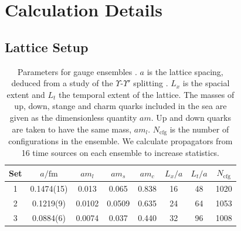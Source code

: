 
\section{Calculation Details}
\label{sec:deets}

\subsection{Lattice Setup}


\begin{table}
\begin{center}
 \begin{tabular}{||c c c c c c c c||}
 \hline
 Set & $a/\text{fm}$ & $am_l$ & $am_s$ & $am_c$ & $L_x/a$ & $L_t/a$ & $N_{\text{cfg}}$ \\ [0.5ex] 
 \hline\hline
 1 & 0.1474(15) & 0.013 & 0.065 & 0.838 & 16 & 48 & 1020 \\ [1ex]
 2 & 0.1219(9) & 0.0102 & 0.0509 & 0.635 & 24 & 64 & 1053 \\ [1ex]
 3 & 0.0884(6) & 0.0074 & 0.037 & 0.440 & 32 & 96 & 1008 \\ [1ex]
 \hline
\end{tabular}
\caption{Parameters for gauge ensembles \cite{Bazavov:2012xda}.
$a$ is the lattice spacing, deduced from a study of the
$\Upsilon$-$\Upsilon'$ splitting \cite{Dowdall:2011wh}. $L_x$ is the spacial extent and $L_t$ the
temporal extent of the lattice. The masses of up, down, stange and
charm quarks included in the sea are given as the dimensionless quantity $am$.
Up and down quarks are taken to have the same mass, $am_l$. $N_{\text{cfg}}$ is the number of configurations in the ensemble. We calculate propagators from 16 time sources on each ensemble to increase statistics. \label{table:ensembles}}
\end{center}
\end{table}

